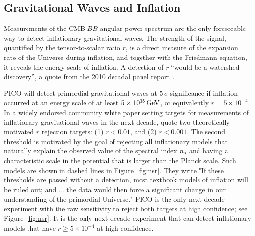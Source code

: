 \documentclass[PICOAPC.tex]{subfiles}
\begin{document}
\subsection{Gravitational Waves and Inflation}
\label{sec:inflation}

Measurements of the \ac{CMB} $BB$ angular power spectrum are the only foreseeable way to detect  inflationary gravitational waves. The strength of the signal, quantified by the tensor-to-scalar ratio $r$, is a direct measure of the expansion rate of the Universe during inflation, and together with the Friedmann equation, it reveals the energy scale of inflation. A detection of $r$  ``would be a watershed discovery'', a quote from the 2010 decadal panel report~\citep{blandford2010}. 

PICO will detect primordial gravitational waves at $5\,\sigma$ significance if inflation occurred at an energy scale of at least $5\times 10^{15}\,\rm{GeV}$, or equivalently $r= 5\times 10^{-4}$.  In a widely endorsed community white paper setting targets for measurements of inflationary gravitational waves in the next decade, \citet{Shandera_etal} quote two theoretically motivated $r$ rejection targets: (1) $r < 0.01$, and (2) $r < 0.001$. The second threshold is motivated by the goal of rejecting all inflationary models that naturally explain the observed value of the spectral index %
$n_{\rm s}$ and having a characteristic scale in the potential that is larger than the Planck scale. Such models are shown in dashed lines in Figure~\ref{fig:nsr}.  
They write "If these thresholds are passed without a detection, most textbook models of inflation will be ruled out; and ...
the data would then force a significant change in our understanding of the primordial Universe." PICO is the only next-decade experiment with the raw sensitivity to reject both targets at high confidence; see Figure~\ref{fig:nsr}. It is the only next-decade experiment that can detect inflationary models that have $r \geq 5\times 10^{-4}$ at high confidence. 
\end{document}

